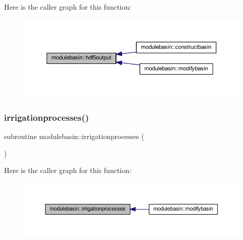 Here is the caller graph for this function\+:\nopagebreak
\begin{figure}[H]
\begin{center}
\leavevmode
\includegraphics[width=350pt]{namespacemodulebasin_a728974f3cdc06d12227aa4b65b29b574_icgraph}
\end{center}
\end{figure}
\mbox{\label{namespacemodulebasin_af1ae0091980128250cba6871d67a941c}} 
\subsubsection{\texorpdfstring{irrigationprocesses()}{irrigationprocesses()}}
{\footnotesize\ttfamily subroutine modulebasin\+::irrigationprocesses (\begin{DoxyParamCaption}{ }\end{DoxyParamCaption})\hspace{0.3cm}{\ttfamily [private]}}

Here is the caller graph for this function\+:\nopagebreak
\begin{figure}[H]
\begin{center}
\leavevmode
\includegraphics[width=350pt]{namespacemodulebasin_af1ae0091980128250cba6871d67a941c_icgraph}
\end{center}
\end{figure}
\mbox{\label{namespacemodulebasin_a766c9c7d623f8a8392b3ed324921f71c}} 
